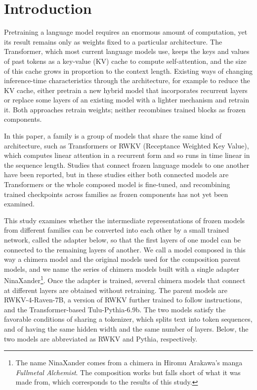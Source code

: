 \documentclass[conference]{IEEEtran}
\newcommand{\kw}[1]{#1}
\begin{document}
\section{Introduction}\label{sec:intro}
Pretraining a language model requires an enormous amount of computation, yet its result remains only as weights fixed to a
particular architecture. The Transformer, which most current language models use, keeps the keys and values of past tokens as a
key-value (KV) cache to compute self-attention, and the size of this cache grows in proportion to the context length. Existing ways
of changing inference-time characteristics through the architecture, for example to reduce the KV cache, either pretrain a new
hybrid model that incorporates recurrent layers or replace some layers of an existing model with a lighter mechanism and retrain it.
Both approaches retrain weights; neither recombines trained blocks as frozen components.

In this paper, a family is a group of models that share the same kind of architecture, such as Transformers or RWKV (Receptance Weighted Key Value), which computes linear attention in a recurrent form and so runs in time linear in the
sequence length.
Studies that connect frozen language models to one another have been reported, but in these studies either both connected models are
Transformers or the whole composed model is fine-tuned, and recombining trained checkpoints across families as frozen components has not
yet been examined.

This study examines whether the intermediate representations of frozen models from different families can be converted into each
other by a small trained network, called the adapter below, so that the first layers of one model can be connected to the remaining
layers of another. We call a model composed in this way a chimera model and the original models used for the composition parent
models, and we name the series of chimera models built with a single adapter
\kw{NinaXander}\footnote{The name NinaXander comes from a chimera in Hiromu Arakawa's manga \emph{Fullmetal Alchemist}. The
composition works but falls short of what it was made from, which corresponds to the results of this study.}.
Once the adapter is trained, several chimera models that connect at different layers are obtained without retraining.
The parent models are RWKV-4-Raven-7B, a version of RWKV further trained to follow instructions, and
the Transformer-based Tulu-Pythia-6.9b. The two models satisfy the favorable conditions of sharing a tokenizer, which splits text into token sequences, and
of having the same hidden width and the same number of layers. Below, the two models are abbreviated as RWKV and Pythia, respectively.
\end{document}
